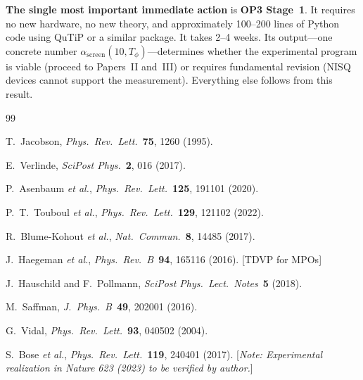 \documentclass[12pt,letterpaper]{article}
\theoremstyle{plain}
\theoremstyle{definition}
\newcommand{\asc}{\alpha_{\mathrm{screen}}}
\begin{document}
\textbf{The single most important immediate action} is \textbf{OP3 Stage~1}.  It requires no new hardware, no new theory, and approximately 100--200 lines of Python code using QuTiP or a similar package.  It takes 2--4 weeks.  Its output---one concrete number $\asc(10, T_\phi)$---determines whether the experimental program is viable (proceed to Papers~II and~III) or requires fundamental revision (NISQ devices cannot support the measurement).  Everything else follows from this result.


\begin{thebibliography}{99}

T.~Jacobson, \textit{Phys.\ Rev.\ Lett.}\ \textbf{75}, 1260 (1995).

E.~Verlinde, \textit{SciPost Phys.}\ \textbf{2}, 016 (2017).

P.~Asenbaum \textit{et al.}, \textit{Phys.\ Rev.\ Lett.}\ \textbf{125}, 191101 (2020).

P.~T.~Touboul \textit{et al.}, \textit{Phys.\ Rev.\ Lett.}\ \textbf{129}, 121102 (2022).

R.~Blume-Kohout \textit{et al.}, \textit{Nat.\ Commun.}\ \textbf{8}, 14485 (2017).

J.~Haegeman \textit{et al.}, \textit{Phys.\ Rev.\ B}\ \textbf{94}, 165116 (2016).
[TDVP for MPOs]

J.~Hauschild and F.~Pollmann,
\textit{SciPost Phys.\ Lect.\ Notes}\ \textbf{5} (2018).

M.~Saffman, \textit{J.\ Phys.\ B}\ \textbf{49}, 202001 (2016).

G.~Vidal, \textit{Phys.\ Rev.\ Lett.}\ \textbf{93}, 040502 (2004).

S.~Bose \textit{et al.}, \textit{Phys.\ Rev.\ Lett.}\ \textbf{119}, 240401 (2017).
[\textit{Note: Experimental realization in Nature 623 (2023) to be verified by author.}]

\end{thebibliography}
\end{document}
